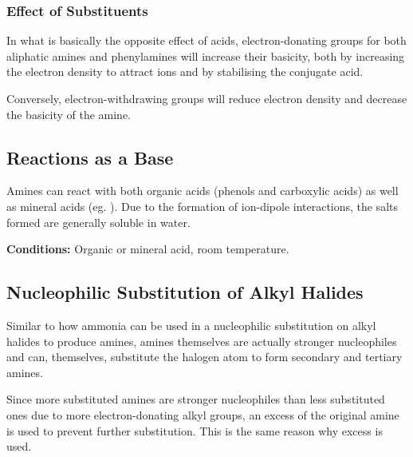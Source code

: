 


			\subsubsection{Effect of Substituents}

				In what is basically the opposite effect of acids, electron-donating groups for both aliphatic amines and phenylamines will
				increase their basicity, both by increasing the electron density to attract  ions and by stabilising the conjugate acid.

				Conversely, electron-withdrawing groups will reduce electron density and decrease the basicity of the amine.




		\pagebreak
		\subsection{Reactions as a Base}

			Amines can react with both organic acids (phenols and carboxylic acids) as well as mineral acids (eg. ). Due to the
			formation of ion-dipole interactions, the salts formed are generally soluble in water.

			\vspace{1.5em}
			\vbox{\textbf{Conditions:}	\tabto{35mm}Organic or mineral acid, room temperature.}




		\subsection{Nucleophilic Substitution of Alkyl Halides}

			Similar to how ammonia can be used in a nucleophilic substitution on alkyl halides to produce amines, amines themselves are actually
			stronger nucleophiles and can, themselves, substitute the halogen atom to form secondary and tertiary amines.

			Since more substituted amines are stronger nucleophiles than less substituted ones due to more electron-donating alkyl groups, an
			excess of the original amine is used to prevent further substitution. This is the same reason why excess  is used.


